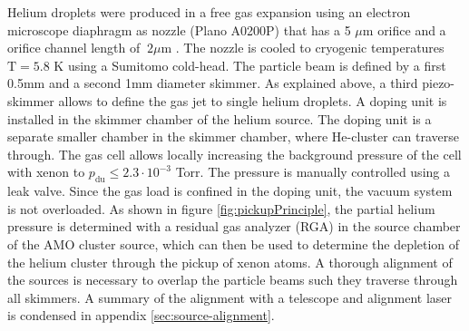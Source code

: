 Helium droplets were produced in a free gas expansion using an electron microscope diaphragm as nozzle (Plano A0200P) that has a 5 $\mu$m orifice and a orifice channel length of $~2 \mu$m  \citep{Gomez-2011-JCP}. The nozzle is cooled to cryogenic temperatures $\text{T}= 5.8$ K using a Sumitomo cold-head. The particle beam is defined by a first 0.5mm and a second 1mm diameter skimmer. As explained above, a third piezo-skimmer allows to define the gas jet to single helium droplets. A doping unit is installed in the skimmer chamber of the helium source. The doping unit is a separate smaller chamber in the skimmer chamber, where He-cluster can traverse through. The gas cell allows locally increasing the background pressure of the cell with xenon to $p_{\text{du}}\leq 2.3\cdot 10^{-3}$ Torr. The pressure is manually controlled using a leak valve. Since the gas load is confined in the doping unit, the vacuum system is not overloaded. As shown in figure \ref{fig:pickupPrinciple}, the partial helium pressure is determined with a residual gas analyzer (RGA) in the source chamber of the AMO cluster source, which can then be used to determine the depletion of the helium cluster through the pickup of xenon atoms. A thorough alignment of the sources is necessary to overlap the particle beams such they traverse through all skimmers. A summary of the alignment with a telescope and alignment laser is condensed in appendix \ref{sec:source-alignment}.
%
%
%
